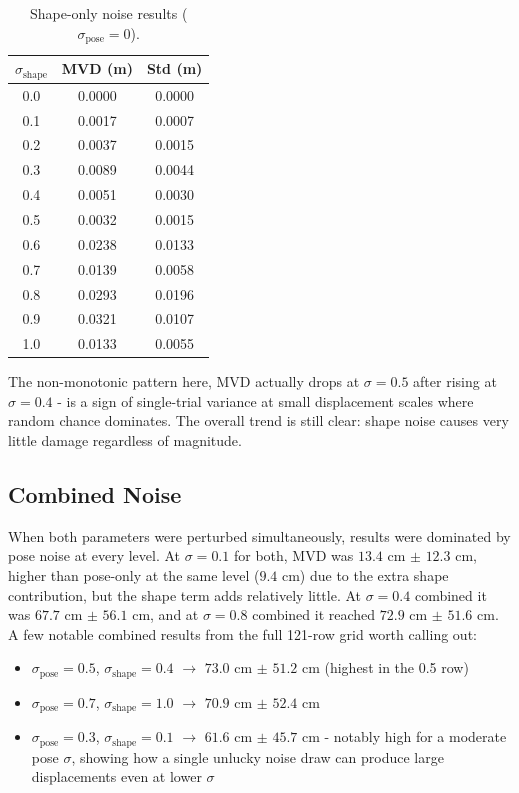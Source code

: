 \documentclass[final]{article}
\begin{document}
\begin{table}[H]
\centering
\caption{Shape-only noise results ($\sigma_{\text{pose}} = 0$).}
\label{tab:shape_only}
\begin{tabular}{|c|c|c|}
    \hline
    $\sigma_{\text{shape}}$ & MVD (m) & Std (m) \\ \hline\hline
    0.0 & 0.0000 & 0.0000 \\ \hline
    0.1 & 0.0017 & 0.0007 \\ \hline
    0.2 & 0.0037 & 0.0015 \\ \hline
    0.3 & 0.0089 & 0.0044 \\ \hline
    0.4 & 0.0051 & 0.0030 \\ \hline
    0.5 & 0.0032 & 0.0015 \\ \hline
    0.6 & 0.0238 & 0.0133 \\ \hline
    0.7 & 0.0139 & 0.0058 \\ \hline
    0.8 & 0.0293 & 0.0196 \\ \hline
    0.9 & 0.0321 & 0.0107 \\ \hline
    1.0 & 0.0133 & 0.0055 \\ \hline
\end{tabular}
\end{table}

The non-monotonic pattern here, MVD actually drops at $\sigma = 0.5$ after 
rising at $\sigma = 0.4$ - is a sign of single-trial variance at small 
displacement scales where random chance dominates. The overall trend is still 
clear: shape noise causes very little damage regardless of magnitude.

\subsection{Combined Noise}

When both parameters were perturbed simultaneously, results were dominated by 
pose noise at every level. At $\sigma = 0.1$ for both, MVD was 
$13.4$ cm $\pm$ $12.3$ cm, higher than pose-only at the same level 
($9.4$ cm) due to the extra shape contribution, but the shape term adds 
relatively little. At $\sigma = 0.4$ combined it was $67.7$ cm $\pm$ $56.1$ cm, 
and at $\sigma = 0.8$ combined it reached $72.9$ cm $\pm$ $51.6$ cm. A few 
notable combined results from the full 121-row grid worth calling out:

\begin{itemize}
    \item $\sigma_{\text{pose}} = 0.5$, $\sigma_{\text{shape}} = 0.4$ 
    $\rightarrow$ $73.0$ cm $\pm$ $51.2$ cm (highest in the 0.5 row)
    \item $\sigma_{\text{pose}} = 0.7$, $\sigma_{\text{shape}} = 1.0$ 
    $\rightarrow$ $70.9$ cm $\pm$ $52.4$ cm
    \item $\sigma_{\text{pose}} = 0.3$, $\sigma_{\text{shape}} = 0.1$ 
    $\rightarrow$ $61.6$ cm $\pm$ $45.7$ cm - notably high for a moderate 
    pose $\sigma$, showing how a single unlucky noise draw can produce large 
    displacements even at lower $\sigma$
\end{itemize}
\end{document}
